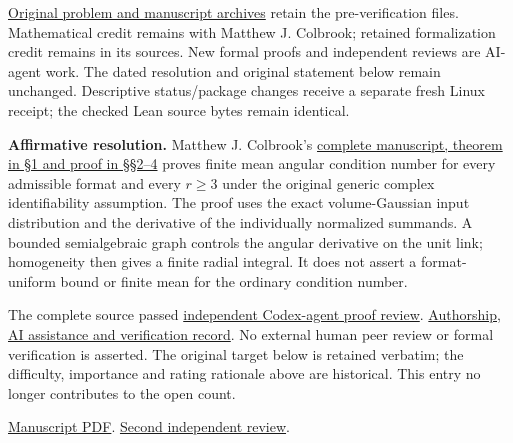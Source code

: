 \documentclass[11pt,a4paper]{article}
\makeatletter
\renewcommand{\subsection}{\Needspace{4\baselineskip}\@startsection{subsection}{2}{0pt}{9pt plus 1pt minus 1pt}{3pt}{\sffamily\bfseries\normalsize\color{ink}}}
\makeatother
\begin{document}
\href{https://github.com/ajt60gaibb/OpenProblemsInNLA/blob/main/docs/lean/proofs/TR-06/originals-c4c7be59/manifest.json}{Original
problem and manuscript archives} retain the pre-verification files.
Mathematical credit remains with Matthew J. Colbrook; retained
formalization credit remains in its sources. New formal proofs and
independent reviews are AI-agent work. The dated resolution and original
statement below remain unchanged. Descriptive status/package changes
receive a separate fresh Linux receipt; the checked Lean source bytes
remain identical.

\subsection{Resolution --- 2026-09-11}\label{resolution-2026-09-11}

\textbf{Affirmative resolution.} Matthew J. Colbrook's
\href{https://github.com/ajt60gaibb/OpenProblemsInNLA/blob/main/references/colbrook-unclaimed-2026-09-11/manuscripts/TR-06.md}{complete
manuscript, theorem in §1 and proof in §§2--4} proves finite mean
angular condition number for every admissible format and every \(r\ge3\)
under the original generic complex identifiability assumption. The proof
uses the exact volume-Gaussian input distribution and the derivative of
the individually normalized summands. A bounded semialgebraic graph
controls the angular derivative on the unit link; homogeneity then gives
a finite radial integral. It does not assert a format-uniform bound or
finite mean for the ordinary condition number.

The complete source passed
\href{https://github.com/ajt60gaibb/OpenProblemsInNLA/blob/main/references/colbrook-unclaimed-2026-09-11/verification/reviews/TR-06-review.md}{independent
Codex-agent proof review}.
\href{https://github.com/ajt60gaibb/OpenProblemsInNLA/blob/main/references/colbrook-unclaimed-2026-09-11/README.md}{Authorship,
AI assistance and verification record}. No external human peer review or
formal verification is asserted. The original target below is retained
verbatim; the difficulty, importance and rating rationale above are
historical. This entry no longer contributes to the open count.

\href{https://github.com/ajt60gaibb/OpenProblemsInNLA/blob/main/references/colbrook-unclaimed-2026-09-11/manuscripts/TR-06.pdf}{Manuscript
PDF}.
\href{https://github.com/ajt60gaibb/OpenProblemsInNLA/blob/main/references/colbrook-unclaimed-2026-09-11/verification/reviews/TR-06-second-review.md}{Second
independent review}.
\end{document}
